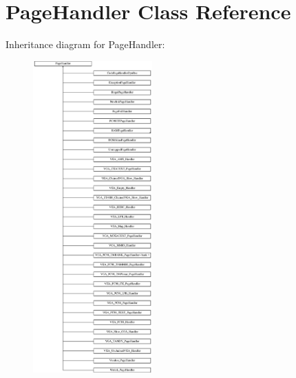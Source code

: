 \hypertarget{classPageHandler}{\section{Page\-Handler Class Reference}
\label{classPageHandler}
}
Inheritance diagram for Page\-Handler\-:\begin{figure}[H]
\begin{center}
\leavevmode
\includegraphics[height=12.000000cm]{classPageHandler}
\end{center}
\end{figure}
